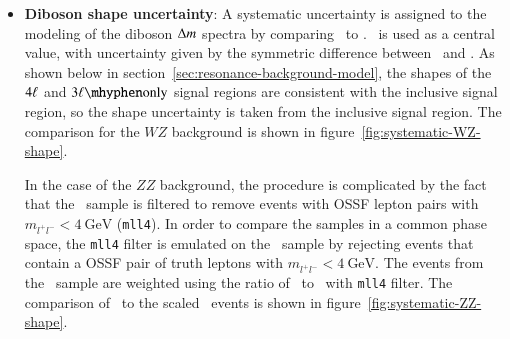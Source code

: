 \begin{itemize}
	\item \textbf{Diboson shape uncertainty}: A systematic uncertainty is assigned to the modeling of the diboson $\Delta m$ spectra by comparing \sherpa\ to \powheg. \sherpa\ is used as a central value, with uncertainty given by the symmetric difference between \sherpa\ and \powheg. As shown below in section~\ref{sec:resonance-background-model}, the shapes of the $4\ell$ and $\threelo$ signal regions are consistent with the inclusive signal region, so the shape uncertainty is taken from the inclusive signal region. The comparison for the $WZ$ background is shown in figure~\ref{fig:systematic-WZ-shape}.


	In the case of the $ZZ$ background, the procedure is complicated by the fact that the \powheg\ sample is filtered to remove events with OSSF lepton pairs with $m_{l^+l^-}<4~\mbox{GeV}$ (\texttt{mll4}). In order to compare the samples in a common phase space, the \texttt{mll4} filter is emulated on the \sherpa\ sample by rejecting events that contain a OSSF pair of truth leptons with $m_{l^+l^-}<4~\mbox{GeV}$. 
	The events from the \powheg\ sample are weighted using the ratio of \sherpa\ to \sherpa\ with \texttt{mll4} filter. The comparison of \sherpa\ to the scaled \powheg\ events is shown in figure~\ref{fig:systematic-ZZ-shape}.


\end{itemize}
